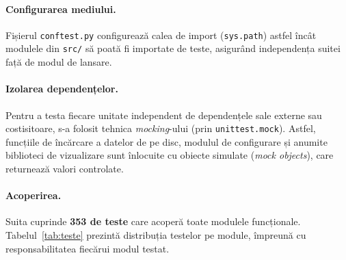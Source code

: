 \documentclass[12pt,a4paper]{report}
\theoremstyle{definition}
\theoremstyle{remark}
\begin{document}
\paragraph{Configurarea mediului.} Fișierul \texttt{conftest.py} configurează
calea de import (\texttt{sys.path}) astfel încât modulele din \texttt{src/} să
poată fi importate de teste, asigurând independența suitei față de modul de
lansare. 

\paragraph{Izolarea dependențelor.} Pentru a testa fiecare unitate independent
de dependențele sale externe sau costisitoare, s-a folosit tehnica
\emph{mocking}-ului (prin \texttt{unittest.mock}). Astfel, funcțiile de
încărcare a datelor de pe disc, modulul de configurare și anumite biblioteci de
vizualizare sunt înlocuite cu obiecte simulate (\emph{mock objects}), care
returnează valori controlate. 

\paragraph{Acoperirea.} Suita cuprinde \textbf{353 de teste} care acoperă toate
modulele funcționale. Tabelul~\ref{tab:teste} prezintă
distribuția testelor pe module, împreună cu responsabilitatea fiecărui modul
testat.
\end{document}

